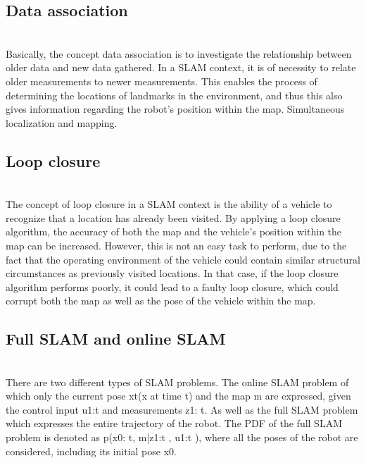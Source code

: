 \subsection{Data association}\\
Basically, the concept data association is to investigate the relationship between older data and new data gathered. In a SLAM context, it is of necessity to relate older measurements to newer measurements. This enables the process of determining the locations of landmarks in the environment, and thus this also gives information regarding the robot's position within the map. 
Simultaneous localization and mapping.\cite{ustintern}



\subsection{Loop closure}\\
The concept of loop closure in a SLAM context is the ability of a vehicle to recognize that a location has already been visited. By applying a loop closure algorithm, the accuracy of both the map and the vehicle's position within the map can be increased. However, this is not an easy task to perform, due to the fact that the operating environment of the vehicle could contain similar structural circumstances as previously visited locations. In that case, if the loop closure algorithm performs poorly, it could lead to a faulty loop closure, which could corrupt both the map as well as the pose of the vehicle within the map.\cite{ustintern}




\subsection{Full SLAM and online SLAM}\\
There are two different types of SLAM problems. The online SLAM problem of which only the current pose xt(x at time t) and the map m are expressed, given the control input u1:t and measurements z1: t. As well as the full SLAM problem which expresses the entire trajectory of the robot. The PDF of the full SLAM problem is denoted as p(x0: t, m|z1:t , u1:t ), where all the poses of the robot are considered, including its initial pose x0.





